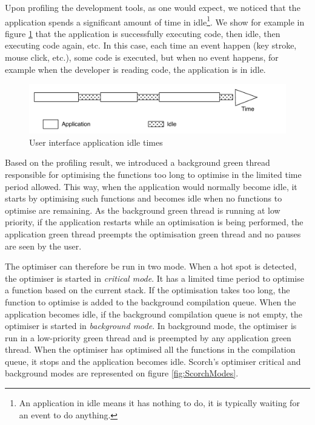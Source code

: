 \documentclass[a4paper,12pt,twoside]{../includes/ThesisStyle}
\begin{document}
Upon profiling the development tools, as one would expect, we noticed that the application spends a significant amount of time in idle\footnote{An application in idle means it has nothing to do, it is typically waiting for an event to do anything.}. We show for example in figure \ref{fig:ApplicationIdle} that the application is successfully executing code, then idle, then executing code again, etc. In this case, each time an event happen (key stroke, mouse click, etc.), some code is executed, but when no event happens, for example when the developer is reading code, the application is in idle.

\begin{figure}[h!]
    \begin{center}
        \includegraphics[width=0.95\linewidth]{ApplicationIdle}
        \caption{User interface application idle times}
        \label{fig:ApplicationIdle}
    \end{center}
\end{figure}

Based on the profiling result, we introduced a background green thread responsible for optimising the functions too long to optimise in the limited time period allowed. This way, when the application would normally become idle, it starts by optimising such functions and becomes idle when no functions to optimise are remaining. As the background green thread is running at low priority, if the application restarts while an optimisation is being performed, the application green thread preempts the optimisation green thread and no pauses are seen by the user.

The optimiser can therefore be run in two mode. When a hot spot is detected, the optimiser is started in \emph{critical mode}. It has a limited time period to optimise a function based on the current stack. If the optimisation takes too long, the function to optimise is added to the background compilation queue. When the application becomes idle, if the background compilation queue is not empty, the optimiser is started in \emph{background mode}. In background mode, the optimiser is run in a low-priority green thread and is preempted by any application green thread. When the optimiser has optimised all the functions in the compilation queue, it stops and the application becomes idle. Scorch's optimiser critical and background modes are represented on figure \ref{fig:ScorchModes}.
\end{document}
